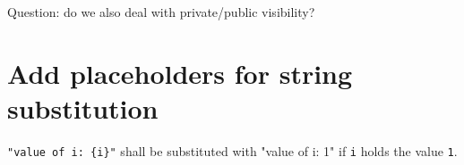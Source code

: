 \documentclass[11pt]{report}
\begin{document}
Question: do we also deal with private/public visibility?

\section{Add placeholders for string substitution}

\texttt{"value of i: \{i\}"} shall be substituted with "value of i: 1" if \texttt{i} holds the value \texttt{1}.

\end{document}
